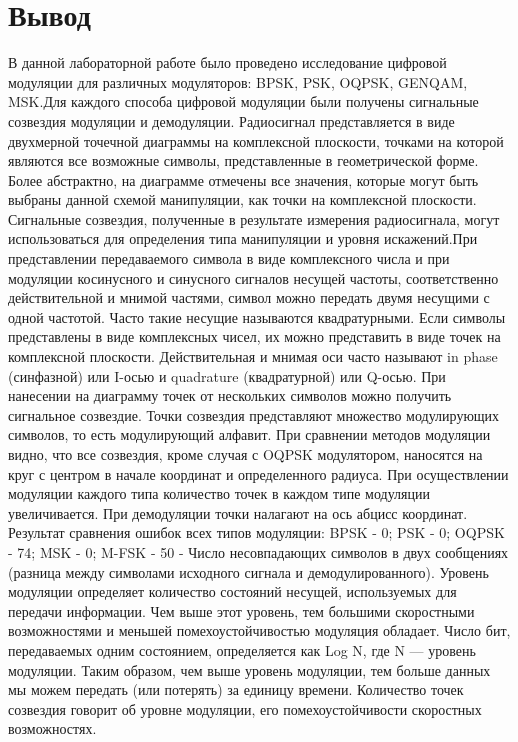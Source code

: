 \documentclass[10pt,a4paper]{report}
\begin{document}
\section{Вывод}
В данной лабораторной работе было проведено исследование цифровой модуляции для различных модуляторов: BPSK, PSK, OQPSK, GENQAM, MSK.Для каждого способа цифровой модуляции
были получены сигнальные созвездия модуляции и демодуляции. Радиосигнал представляется в виде двухмерной точечной диаграммы на комплексной плоскости, точками на которой 
являются все возможные символы, представленные в геометрической форме. Более абстрактно, на диаграмме отмечены все значения, которые могут быть выбраны данной схемой 
манипуляции, как точки на комплексной плоскости. Сигнальные созвездия, полученные в результате измерения радиосигнала, могут использоваться для определения типа манипуляции
 и уровня искажений.При представлении передаваемого символа в виде комплексного числа и при модуляции косинусного и синусного сигналов несущей частоты, 
соответственно действительной и мнимой частями, символ можно передать двумя несущими с одной частотой. Часто такие несущие называются квадратурными.
 Если символы представлены в виде комплексных чисел, их можно представить в виде точек на комплексной плоскости. Действительная и мнимая оси часто называют in phase (синфазной)
 или I-осью и quadrature (квадратурной) или Q-осью. При нанесении на диаграмму точек от нескольких символов можно получить сигнальное созвездие. Точки созвездия
 представляют множество модулирующих символов, то есть модулирующий алфавит.
При сравнении методов модуляции видно, что все созвездия, кроме случая с OQPSK модулятором, наносятся на круг с центром в начале координат и определенного радиуса. При осуществлении модуляции каждого типа 
количество точек в каждом типе модуляции увеличивается. При демодуляции точки налагают на ось абцисс координат.
Результат сравнения ошибок всех типов модуляции:
BPSK - 0; PSK - 0; OQPSK - 74; MSK - 0; M-FSK - 50 - Число несовпадающих символов в двух сообщениях (разница между символами исходного сигнала и демодулированного).
Уровень модуляции определяет количество состояний несущей, используемых для передачи информации. Чем выше этот уровень, тем большими скоростными возможностями и меньшей
 помехоустойчивостью модуляция обладает. Число бит, передаваемых одним состоянием, определяется как Log N, где N — уровень модуляции. Таким образом, чем выше уровень 
модуляции, тем больше данных мы можем передать (или потерять) за единицу времени. Количество точек созвездия говорит об уровне модуляции, его помехоустойчивости
скоростных возможностях.
\end{document}
